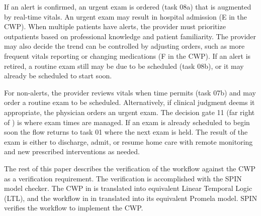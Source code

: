If an alert is confirmed, an urgent exam is ordered (task 08a) that is augmented by real-time vitals. An urgent exam may result in hospital admission (E in the CWP). When multiple patients have alerts, the provider must prioritize outpatients based on professional knowledge and patient familiarity. The provider may also decide the trend can be controlled by adjusting orders, such as more frequent vitals reporting or changing medications (F in the CWP). If an alert is retired, a routine exam still may be due to be scheduled (task 08b), or it may already be scheduled to start soon. 

For non-alerts, the provider reviews vitals when time permits (task 07b) and may order a routine exam to be scheduled. Alternatively, if clinical judgment deems it appropriate, the physician orders an urgent exam.
The decision gate 11 (far right of ) is where exam times are managed. If an exam is already scheduled to begin soon the flow returns to task 01 where the next exam is held. The result of the exam is either to discharge, admit, or resume home care with remote monitoring and new prescribed interventions as needed.

The rest of this paper describes the verification of the workflow against the CWP as a verification requirement. The verification is accomplished with the SPIN model checker. The CWP in  is translated into equivalent Linear Temporal Logic (LTL), and the workflow in  in translated into its equivalent Promela model. SPIN verifies the workflow to implement the CWP.
